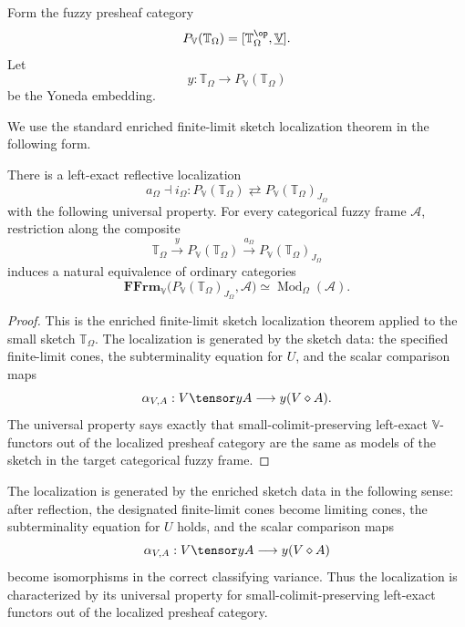 Form the fuzzy presheaf category
\[
    P_{\mathbb V}(\mathbb T_{\Omega})
    =
    [\mathbb T_{\Omega}^{\op},\underline{\mathbb V}].
\]
Let
\[
    y:\mathbb T_{\Omega}\to P_{\mathbb V}(\mathbb T_{\Omega})
\]
be the Yoneda embedding.

We use the standard enriched finite-limit sketch localization theorem in the
following form.

\begin{proposition}
\label{prop:sierpinski-sketch-localization}
There is a left-exact reflective localization
\[
    a_{\Omega}\dashv i_{\Omega}:
    P_{\mathbb V}(\mathbb T_{\Omega})
    \rightleftarrows
    P_{\mathbb V}(\mathbb T_{\Omega})_{J_{\Omega}}
\]
with the following universal property. For every categorical fuzzy frame
\(\mathcal A\), restriction along the composite
\[
    \mathbb T_{\Omega}
    \xrightarrow{y}
    P_{\mathbb V}(\mathbb T_{\Omega})
    \xrightarrow{a_{\Omega}}
    P_{\mathbb V}(\mathbb T_{\Omega})_{J_{\Omega}}
\]
induces a natural equivalence of ordinary categories
\[
    \mathbf{FFrm}_{\mathbb V}
    \bigl(P_{\mathbb V}(\mathbb T_{\Omega})_{J_{\Omega}},\mathcal A\bigr)
    \simeq
    \operatorname{Mod}_{\Omega}(\mathcal A).
\]
\end{proposition}

\begin{proof}
This is the enriched finite-limit sketch localization theorem applied to the small
sketch \(\mathbb T_{\Omega}\). The localization is generated by the sketch data: the
specified finite-limit cones, the subterminality equation for \(U\), and the scalar
comparison maps
\[
    \alpha_{V,A}:
    V\tensor yA
    \longrightarrow
    y(V\diamond A).
\]
The universal property says exactly that small-colimit-preserving left-exact
\(\mathbb V\)-functors out of the localized presheaf category are the same as
models of the sketch in the target categorical fuzzy frame.
\end{proof}

The localization is generated by the enriched sketch data in the following sense:
after reflection, the designated finite-limit cones become limiting cones, the
subterminality equation for \(U\) holds, and the scalar comparison maps
\[
    \alpha_{V,A}:
    V\tensor yA
    \longrightarrow
    y(V\diamond A)
\]
become isomorphisms in the correct classifying variance. Thus the localization is
characterized by its universal property for small-colimit-preserving left-exact
functors out of the localized presheaf category.

